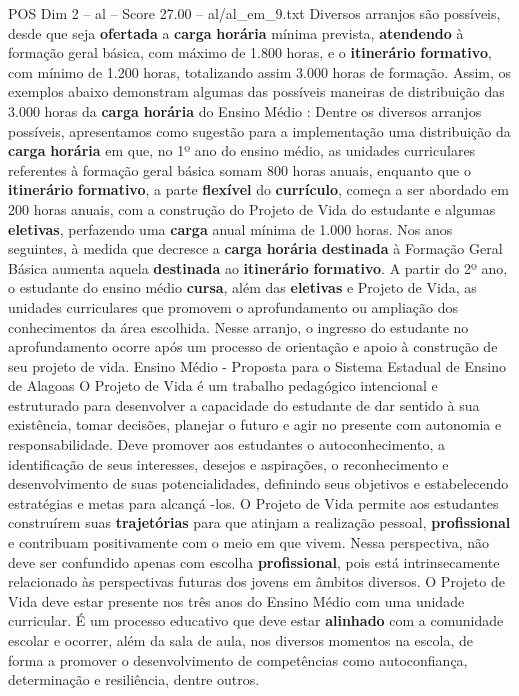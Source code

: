 \begin{textsample}{POS Dim 2 – al – Score 27.00 – al/al\_em\_9.txt}
Diversos arranjos são possíveis, desde que seja \textbf{ofertada} a \textbf{carga} \textbf{horária} mínima prevista, \textbf{atendendo} à formação geral básica, com máximo de 1.800 horas, e o \textbf{itinerário} \textbf{formativo}, com mínimo de 1.200 horas, totalizando assim 3.000 horas de formação.
Assim, os exemplos abaixo demonstram algumas das possíveis maneiras de distribuição das 3.000 horas da \textbf{carga} \textbf{horária} do Ensino Médio : Dentre os diversos arranjos possíveis, apresentamos como sugestão para a implementação uma distribuição da \textbf{carga} \textbf{horária} em que, no 1º ano do ensino médio, as unidades curriculares referentes à formação geral básica somam 800 horas anuais, enquanto que o \textbf{itinerário} \textbf{formativo}, a parte \textbf{flexível} do \textbf{currículo}, começa a ser abordado em 200 horas anuais, com a construção do Projeto de Vida do estudante e algumas \textbf{eletivas}, perfazendo uma \textbf{carga} anual mínima de 1.000 horas.
Nos anos seguintes, à medida que decresce a \textbf{carga} \textbf{horária} \textbf{destinada} à Formação Geral Básica aumenta aquela \textbf{destinada} ao \textbf{itinerário} \textbf{formativo}.
A partir do 2º ano, o estudante do ensino médio \textbf{cursa}, além das \textbf{eletivas} e Projeto de Vida, as unidades curriculares que promovem o aprofundamento ou ampliação dos conhecimentos da área escolhida.
Nesse arranjo, o ingresso do estudante no aprofundamento ocorre após um processo de orientação e apoio à construção de seu projeto de vida.
Ensino Médio - Proposta para o Sistema Estadual de Ensino de Alagoas O Projeto de Vida é um trabalho pedagógico intencional e estruturado para desenvolver a capacidade do estudante de dar sentido à sua existência, tomar decisões, planejar o futuro e agir no presente com autonomia e responsabilidade.
Deve promover aos estudantes o autoconhecimento, a identificação de seus interesses, desejos e aspirações, o reconhecimento e desenvolvimento de suas potencialidades, definindo seus objetivos e estabelecendo estratégias e metas para alcançá -los.
O Projeto de Vida permite aos estudantes construírem suas \textbf{trajetórias} para que atinjam a realização pessoal, \textbf{profissional} e contribuam positivamente com o meio em que vivem.
Nessa perspectiva, não deve ser confundido apenas com escolha \textbf{profissional}, pois está intrinsecamente relacionado às perspectivas futuras dos jovens em âmbitos diversos.
O Projeto de Vida deve estar presente nos três anos do Ensino Médio com uma unidade curricular.
É um processo educativo que deve estar \textbf{alinhado} com a comunidade escolar e ocorrer, além da sala de aula, nos diversos momentos na escola, de forma a promover o desenvolvimento de competências como autoconfiança, determinação e resiliência, dentre outros.

\end{textsample}
